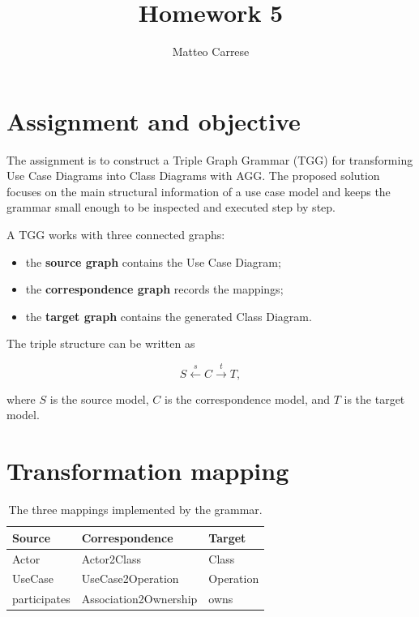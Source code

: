 \documentclass[11pt,a4paper]{article}
\title{
    \vspace{-1.2cm}
    \textcolor{heading}{\Huge\bfseries Homework 5}\\[0.35cm]
}
\author{Matteo Carrese}
\date{}
\begin{document}
\maketitle


\section{Assignment and objective}

The assignment is to construct a Triple Graph Grammar (TGG) for transforming
Use Case Diagrams into Class Diagrams with AGG. The proposed solution focuses
on the main structural information of a use case model and keeps the grammar
small enough to be inspected and executed step by step.

A TGG works with three connected graphs:

\begin{itemize}
    \item the \textbf{source graph} contains the Use Case Diagram;
    \item the \textbf{correspondence graph} records the mappings;
    \item the \textbf{target graph} contains the generated Class Diagram.
\end{itemize}

The triple structure can be written as

\[
S \xleftarrow{\;s\;} C \xrightarrow{\;t\;} T,
\]

where $S$ is the source model, $C$ is the correspondence model, and $T$ is the
target model.

\section{Transformation mapping}

\begin{table}[H]
\centering
\begin{tabular}{>{\raggedright\arraybackslash}p{}
                >{\raggedright\arraybackslash}p{}
                >{\raggedright\arraybackslash}p{}}
\toprule
\textbf{Source} & \textbf{Correspondence} & \textbf{Target} \\
\midrule
\textcolor{sourceRed}{Actor} & \textcolor{traceGold}{Actor2Class} &
\textcolor{targetBlue}{Class} \\
\textcolor{sourceRed}{UseCase} & \textcolor{traceGold}{UseCase2Operation} &
\textcolor{targetBlue}{Operation} \\
\textcolor{sourceRed}{participates} &
\textcolor{traceGold}{Association2Ownership} &
\textcolor{targetBlue}{owns} \\
\bottomrule
\end{tabular}
\caption{The three mappings implemented by the grammar.}
\end{table}
\end{document}
